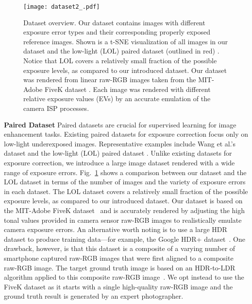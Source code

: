 \documentclass[final]{cvpr}
\begin{document}
\begin{figure}[t]
\centering
\texttt{[image: dataset2\_.pdf]}
\vspace{-6mm}
\caption{Dataset overview. Our dataset contains images with different exposure error types and their corresponding properly exposed reference images. Shown is a t-SNE visualization \cite{maaten2008visualizing} of all images in our dataset and the low-light (LOL) paired dataset (outlined in red) \cite{Chen2018Retinex}.  Notice that LOL covers a relatively small fraction of the possible exposure levels, as compared
to our introduced dataset.
Our dataset was rendered from linear raw-RGB images taken from the MIT-Adobe FiveK dataset \cite{fivek}. Each image was rendered with different relative exposure values (EVs) by an accurate emulation of the camera ISP processes.\vspace{-4mm}}
\label{fig:dataset}
\end{figure}


\noindent\textbf{Paired Dataset } Paired datasets are crucial for supervised learning for image enhancement tasks. Existing paired datasets for exposure correction focus only on low-light underexposed images. Representative examples include Wang et al.'s dataset \cite{DeepUPE} and the low-light (LOL) paired dataset \cite{Chen2018Retinex}.
Unlike existing datasets for exposure correction, we introduce a large image dataset rendered with a wide range of exposure errors. Fig.\ \ref{fig:dataset} shows a comparison between our dataset and the LOL dataset in terms of the number of images and the variety of exposure errors in each dataset. The LOL dataset covers a relatively small fraction of the possible exposure levels, as compared to our introduced dataset.  Our dataset is based on the MIT-Adobe FiveK dataset~\cite{fivek} and is accurately rendered by adjusting the high tonal values provided in camera sensor raw-RGB images to realistically emulate camera exposure errors.  An alternative worth noting is to use a large HDR dataset to produce training data---for example, the Google HDR+ dataset~\cite{hasinoff2016burst}. One drawback, however, is that this dataset is a composite of a varying number of smartphone captured raw-RGB images that were first aligned to a composite raw-RGB image.  The target ground truth image is based on an HDR-to-LDR algorithm applied to this composite raw-RGB image~\cite{hasinoff2016burst, HDRNET}.  We opt instead to use the FiveK dataset as it starts with a single high-quality raw-RGB image and the ground truth result is generated by an expert photographer.
\end{document}
